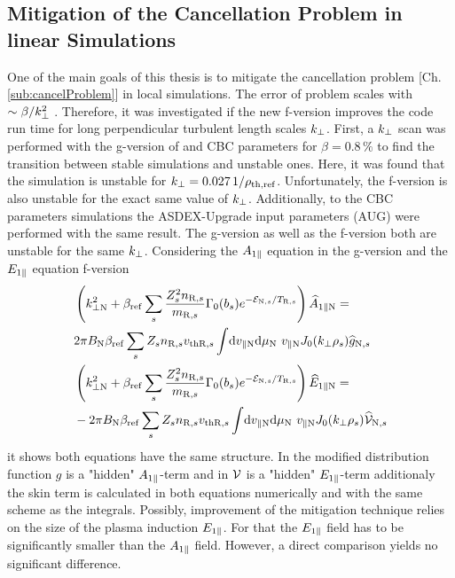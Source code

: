 \subsection{Mitigation of the Cancellation Problem in linear Simulations}
\label{sub:mitigationLinearFVersion}

One of the main goals of this thesis is to mitigate the cancellation problem [Ch. \ref{sub:cancelProblem}] in local simulations. The error of problem scales with $\sim \beta/k_\perp^2$ \cite{Mishchenko2017}. Therefore, it was investigated if the new f-version improves the code run time for long perpendicular turbulent length scales $k_\perp$. First, a $k_\perp$ scan was performed with the g-version of {\gkw} and CBC parameters for $\beta = 0.8\,\%$ to find the transition between stable simulations and unstable ones. Here, it was found that the simulation is unstable for $k_\perp = 0.027\,1/\rho_{\mathrm{th},\mathrm{ref}}$. Unfortunately, the f-version is also unstable for the exact same value of $k_\perp$. Additionally, to the CBC parameters simulations the ASDEX-Upgrade input parameters (AUG) were performed with the same result. The g-version as well as the f-version both are unstable for the same $k_\perp$. Considering the $A_{1\parallel}$ equation in the g-version and the $E_{1\parallel}$ equation f-version
\begin{gather}
    \begin{aligned}
        &\left(k_{\perp \mathrm{N}}^2 + \beta_\mathrm{ref} \sum_s \frac{Z^2_sn_{\mathrm{R},s}}{m_{\mathrm{R},s}} \Gamma_0(b_s) e^{-\mathcal{E}_{\mathrm{N},s}/T_{\mathrm{R},s}} \right) \widehat{A}_{1\parallel \mathrm{N}} = \\
        & 2\pi B_\mathrm{N} \beta_\mathrm{ref} \sum_s Z_s n_{\mathrm{R},s} v_{\mathrm{th}\mathrm{R},s} \int \! \mathrm{d}v_{\parallel \mathrm{N}} \mathrm{d}\mu_\mathrm{N} ~ v_{\parallel \mathrm{N}} J_0(k_\perp \rho_s) \widehat{g}_{\mathrm{N},s}\\
        &\left(k_{\perp \mathrm{N}}^2 + \beta_\mathrm{ref} \sum_s \frac{Z^2_sn_{\mathrm{R},s}}{m_{\mathrm{R},s}} \Gamma_0(b_s) e^{-\mathcal{E}_{\mathrm{N},s}/T_{\mathrm{R},s}} \right) \widehat{E}_{1\parallel \mathrm{N}} = \\
        &- 2\pi B_\mathrm{N} \beta_\mathrm{ref} \sum_s Z_s n_{\mathrm{R},s} v_{\mathrm{th}\mathrm{R},s} \int \! \mathrm{d}v_{\parallel \mathrm{N}} \mathrm{d}\mu_\mathrm{N} ~ v_{\parallel \mathrm{N}} J_0(k_\perp \rho_s) \widehat{\mathcal{V}}_{\mathrm{N},s}
    \end{aligned}
    \label{eq:compareAparEpar}
\end{gather}
it shows both equations have the same structure. In the modified distribution function $g$ is a "hidden" $A_{1\parallel}$-term and in $\mathcal{V}$ is a "hidden" $E_{1\parallel}$-term additionaly the skin term is calculated in both equations numerically and with the same scheme as the integrals. Possibly, improvement of the mitigation technique relies on the size of the plasma induction $E_{1\parallel}$. For that the $E_{1\parallel}$ field has to be significantly smaller than the $A_{1\parallel}$ field. However, a direct comparison yields no significant difference. \bigskip

